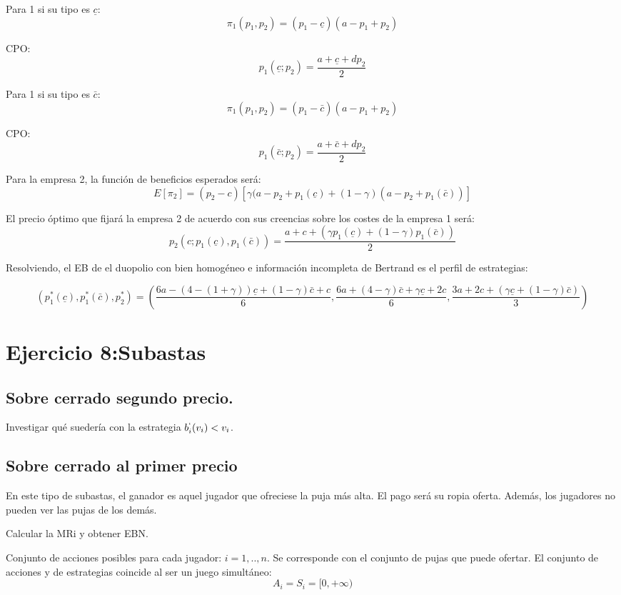 \documentclass{article}
\theoremstyle{definition}
\theoremstyle{remark}
\begin{document}
Para 1 si su tipo es $\underline{c}$:
$$\pi_1(p_1,p_2)=(p_1-\underline{c})(a-p_1+p_2)$$

CPO:
$$p_1(\underline{c};p_2)=\frac{a+\underline{c}+dp_2}{2}$$

Para 1 si su tipo es $\bar{c}$:
$$\pi_1(p_1,p_2)=(p_1-\bar{c})(a-p_1+p_2)$$

CPO:
$$p_1(\bar{c};p_2)=\frac{a+\bar{c}+dp_2}{2}$$

Para la empresa 2, la funci\'on de beneficios esperados ser\'a:
$$E[\pi_2]=(p_2-c)[\gamma(a-p_2+p_1(\underline{c})+(1-\gamma)(a-p_2+p_1(\bar{c}))]$$

El precio \'optimo que fijar\'a la empresa 2 de acuerdo con sus creencias sobre los costes de la empresa 1 ser\'a:
$$p_2(c;p_1(\underline{c}),p_1(\bar{c}))=\frac{a+c+(\gamma p_1(\underline{c})+(1-\gamma)p_1(\bar{c}))}{2}$$

Resolviendo, el EB de el duopolio con bien homog\'eneo e informaci\'on incompleta de Bertrand es el perfil de estrategias:

$${(p_1^*(\underline{c}),p_1^*(\bar{c}),p_2^*)}={(\frac{6a-(4-(1+\gamma))\underline{c}+(1-\gamma)\bar{c}+c}{6},\frac{6a+(4-\gamma)\bar{c}+\gamma \underline{c}+2c}{6},\frac{3a+2c+(\gamma \underline{c}+(1-\gamma)\bar{c})}{3})}$$









\section{Ejercicio 8:Subastas}
\subsection{Sobre cerrado segundo precio.}
Investigar qu\'e sueder\'ia con la estrategia $b_i^`(v_i)<v_i$.
\subsection{Sobre cerrado al primer precio}

En este tipo de subastas, el ganador es aquel jugador que ofreciese la puja m\'as alta. El pago ser\'a su ropia oferta. Adem\'as, los jugadores no pueden ver las pujas de los dem\'as.

Calcular la MRi y obtener EBN.

Conjunto de acciones posibles para cada jugador: $i=1,..,n$. Se corresponde con el conjunto de pujas que puede ofertar.
El conjunto de acciones y de estrategias coincide al ser un juego simult\'aneo:
$$A_i=S_i=[0,+\infty)$$
\end{document}
